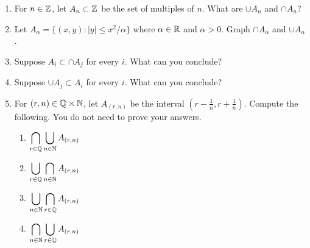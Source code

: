 \begin{enumerate}
    \item For $n \in \mathbb{Z}$, let $A_n \subset \mathbb{Z}$ be the set of multiples of $n$. What are $\cup A_n$ and $\cap A_n$?

    \item Let $A_\alpha = \{(x,y): |y| \leq x^2/\alpha\}$ where $\alpha \in \mathbb{R}$ and $\alpha > 0$. Graph $\cap A_\alpha$ and $\cup A_\alpha$.

    \item Suppose $A_i \subset \cap A_j$ for every $i$. What can you conclude?

    \item Suppose $\cup A_j \subset A_i$ for every $i$. What can you conclude?

    \item For $(r, n) \in \mathbb{Q} \times \mathbb{N}$, let $A_{(r,n)}$ be the interval $(r - \frac{1}{n}, r + \frac{1}{n})$. Compute the following. You do not need to prove your answers.
  \begin{enumerate}
      \item $\displaystyle\bigcap_{r \in \mathbb{Q}} \bigcup_{n \in \mathbb{N}} A_{(r,n)}$
      \item $\displaystyle\bigcup_{r \in \mathbb{Q}} \bigcap_{n \in \mathbb{N}} A_{(r,n)}$
      \item $\displaystyle\bigcup_{n \in \mathbb{N}} \bigcap_{r \in \mathbb{Q}} A_{(r,n)}$
      \item $\displaystyle\bigcap_{n \in \mathbb{N}} \bigcup_{r \in \mathbb{Q}} A_{(r,n)}$
  \end{enumerate}

\end{enumerate}
